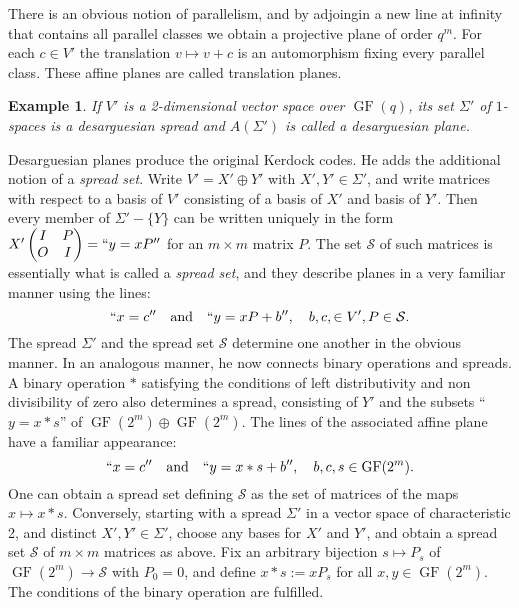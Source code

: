 \documentclass[a4paper]{article}
\DeclareMathOperator{\GF}{GF}
\newtheorem{example}{Example}
\begin{document}
  There is an obvious notion of parallelism, and by
  adjoingin a new line at infinity that contains all
  parallel classes we obtain a projective plane of order
  $q^{m}$. For each $c \in V'$ the translation $v \mapsto v
  + c$ is an automorphism fixing every parallel class. These
  affine planes are called translation planes.

  \begin{example}
    If $V'$ is a 2-dimensional vector space over $\GF(q)$,
    its set $\Sigma'$ of $1$-spaces is a desarguesian spread
    and $A(\Sigma')$ is called a desarguesian plane.
  \end{example}

  Desarguesian planes produce the original Kerdock codes. He
  adds the additional notion of a \textit{spread set}. Write
  $V' = X' \oplus Y'$ with $X',Y' \in \Sigma'$, and write
  matrices with respect to a basis of $V'$ consisting of a
  basis of $X'$ and basis of $Y'$. Then every member of
  $\Sigma' - \{Y\}$ can be written uniquely in the form $X'
  \begin{pmatrix} I & P \\ O & I \end{pmatrix} = ``y = xP''$
  for an $m \times m$ matrix $P$. The set $\mathcal S$ of
  such matrices is essentially what is called a
  \textit{spread set}, and they describe planes in a very
  familiar manner using the lines:
  \[
    ``x = c''
    \quad
    \text{and}
    \quad
    ``y = xP + b'',
    \quad b,c, \in V', P \in \mathcal S.
  \] 
  The spread $\Sigma'$ and the spread set $\mathcal S$ 
  determine one another in the obvious manner. In an
  analogous manner, he now connects binary operations and
  spreads. A binary operation $*$ satisfying the conditions
  of left distributivity and non divisibility of zero also
  determines a spread, consisting of $Y'$ and the subsets
  ``$y=x * s$'' of  $\GF(2^{m}) \oplus \GF(2^{m})$. The
  lines of the associated affine plane have a familiar
  appearance:
  \[
    ``x=c''
    \quad
    \text{and}
    \quad
    ``y=x*s+b'',
    \quad
    b,c,s \in \GF(2^{m}).
  \] 
  One can obtain a spread set defining $\mathcal S$ as the
  set of matrices of the maps $x \mapsto x * s$. Conversely,
  starting with a spread $\Sigma'$ in a vector space of
  characteristic 2, and distinct $X',Y' \in \Sigma'$, choose
  any bases for $X'$ and $Y'$, and obtain a spread set
  $\mathcal S$ of $m \times m$ matrices as above. Fix an
  arbitrary bijection $s \mapsto P_s$ of $\GF(2^{m}) \to
  \mathcal S$ with $P_0 = 0$, and define $x * s := xP_s$ for
  all $x,y \in \GF(2^{m})$. The conditions of the binary
  operation are fulfilled.
\end{document}
